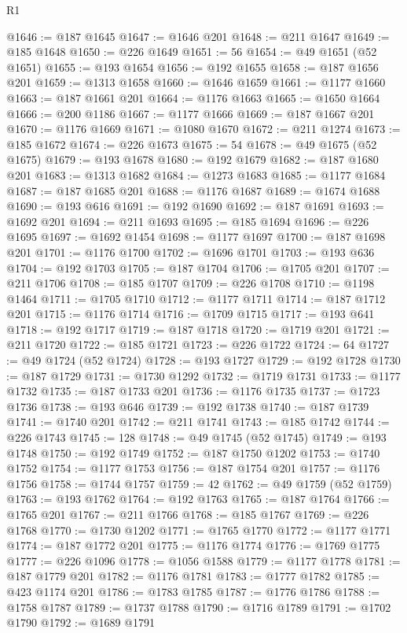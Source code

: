 \begin{lexlean}{R1}
\begin{coremodule}
@1646 := @187 @1645
@1647 := @1646 @201
@1648 := @211 @1647
@1649 := @185 @1648
@1650 := @226 @1649
@1651 := 56
@1654 := @49 @1651 (@52 @1651)
@1655 := @193 @1654
@1656 := @192 @1655
@1658 := @187 @1656 @201
@1659 := @1313 @1658
@1660 := @1646 @1659
@1661 := @1177 @1660
@1663 := @187 @1661 @201
@1664 := @1176 @1663
@1665 := @1650 @1664
@1666 := @200 @1186
@1667 := @1177 @1666
@1669 := @187 @1667 @201
@1670 := @1176 @1669
@1671 := @1080 @1670
@1672 := @211 @1274
@1673 := @185 @1672
@1674 := @226 @1673
@1675 := 54
@1678 := @49 @1675 (@52 @1675)
@1679 := @193 @1678
@1680 := @192 @1679
@1682 := @187 @1680 @201
@1683 := @1313 @1682
@1684 := @1273 @1683
@1685 := @1177 @1684
@1687 := @187 @1685 @201
@1688 := @1176 @1687
@1689 := @1674 @1688
@1690 := @193 @616
@1691 := @192 @1690
@1692 := @187 @1691
@1693 := @1692 @201
@1694 := @211 @1693
@1695 := @185 @1694
@1696 := @226 @1695
@1697 := @1692 @1454
@1698 := @1177 @1697
@1700 := @187 @1698 @201
@1701 := @1176 @1700
@1702 := @1696 @1701
@1703 := @193 @636
@1704 := @192 @1703
@1705 := @187 @1704
@1706 := @1705 @201
@1707 := @211 @1706
@1708 := @185 @1707
@1709 := @226 @1708
@1710 := @1198 @1464
@1711 := @1705 @1710
@1712 := @1177 @1711
@1714 := @187 @1712 @201
@1715 := @1176 @1714
@1716 := @1709 @1715
@1717 := @193 @641
@1718 := @192 @1717
@1719 := @187 @1718
@1720 := @1719 @201
@1721 := @211 @1720
@1722 := @185 @1721
@1723 := @226 @1722
@1724 := 64
@1727 := @49 @1724 (@52 @1724)
@1728 := @193 @1727
@1729 := @192 @1728
@1730 := @187 @1729
@1731 := @1730 @1292
@1732 := @1719 @1731
@1733 := @1177 @1732
@1735 := @187 @1733 @201
@1736 := @1176 @1735
@1737 := @1723 @1736
@1738 := @193 @646
@1739 := @192 @1738
@1740 := @187 @1739
@1741 := @1740 @201
@1742 := @211 @1741
@1743 := @185 @1742
@1744 := @226 @1743
@1745 := 128
@1748 := @49 @1745 (@52 @1745)
@1749 := @193 @1748
@1750 := @192 @1749
@1752 := @187 @1750 @1202
@1753 := @1740 @1752
@1754 := @1177 @1753
@1756 := @187 @1754 @201
@1757 := @1176 @1756
@1758 := @1744 @1757
@1759 := 42
@1762 := @49 @1759 (@52 @1759)
@1763 := @193 @1762
@1764 := @192 @1763
@1765 := @187 @1764
@1766 := @1765 @201
@1767 := @211 @1766
@1768 := @185 @1767
@1769 := @226 @1768
@1770 := @1730 @1202
@1771 := @1765 @1770
@1772 := @1177 @1771
@1774 := @187 @1772 @201
@1775 := @1176 @1774
@1776 := @1769 @1775
@1777 := @226 @1096
@1778 := @1056 @1588
@1779 := @1177 @1778
@1781 := @187 @1779 @201
@1782 := @1176 @1781
@1783 := @1777 @1782
@1785 := @423 @1174 @201
@1786 := @1783 @1785
@1787 := @1776 @1786
@1788 := @1758 @1787
@1789 := @1737 @1788
@1790 := @1716 @1789
@1791 := @1702 @1790
@1792 := @1689 @1791

\end{coremodule}
\end{lexlean}
